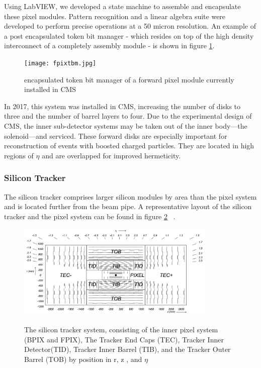 Using LabVIEW, we developed a state machine to assemble and encapsulate these pixel modules. Pattern recognition and a linear algebra suite were developed to perform precise operations at a 50 micron resolution. An example of a post encapsulated token bit manager - which resides on top of the high density interconnect of a completely assembly module - is shown in figure \ref{fig:tbm}.

\begin{figure}[ht!b]
    \centering
  \texttt{[image: fpixtbm.jpg]}
    \caption{\label{fig:tbm} encapsulated token bit manager of a forward pixel module currently installed in CMS}
\end{figure}


In 2017, this system was installed in CMS, increasing the number of disks to three and the number of barrel layers to four.  Due to the experimental design of CMS, the inner sub-detector systems may be taken out of the inner body---the solenoid---and serviced.  
These forward disks are especially important for reconstruction of events with boosted charged particles. They are located in high regions of $\eta$ and are overlapped for improved hermeticity.  


\subsubsection{Silicon Tracker}
The silicon tracker comprises larger silicon modules by area than the pixel system and is located further from the beam pipe. A representative layout of the silicon tracker and the pixel system can be found in figure \ref{fig:tracker} ~\cite{Chatrchyan:2008zzk}. 

\begin{figure}[ht!b]
\label{fig:tracker}
  \centering
  \includegraphics[width=0.85\textwidth]{figures/silicon/SiliconTracker.png}\\
    \caption{ The silicon tracker system, consisting of the inner pixel system (BPIX and FPIX), The Tracker End Caps (TEC), Tracker Inner Detector(TID), Tracker Inner Barrel (TIB), and the Tracker Outer Barrel (TOB) by position in r, z , and $\eta$ ~\cite{Chatrchyan:2008zzk}}
\end{figure}



